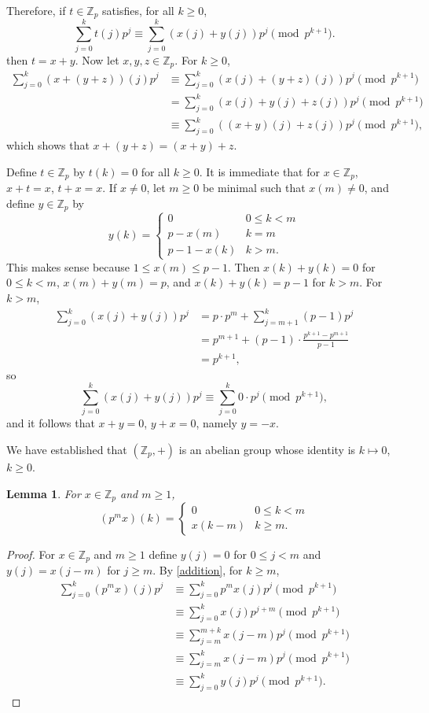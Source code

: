 \documentclass{article}
\newtheorem{lemma}[theorem]{Lemma}
\theoremstyle{definition}
\begin{document}
Therefore, if $t \in \mathbb{Z}_p$ satisfies, for all $k \geq 0$,
\[
\sum_{j=0}^k t(j) p^j \equiv \sum_{j=0}^k (x(j)+y(j)) p^j \pmod{p^{k+1}}.
\]
then $t=x+y$.
Now let $x,y,z \in \mathbb{Z}_p$. For $k \geq 0$,
\begin{align*}
\sum_{j=0}^k (x+(y+z))(j) p^j &\equiv \sum_{j=0}^k (x(j)+(y+z)(j)) p^j \pmod{p^{k+1}}\\
&=\sum_{j=0}^k (x(j)+y(j)+z(j)) p^j \pmod{p^{k+1}}\\
&\equiv \sum_{j=0}^k ((x+y)(j)+z(j)) p^j \pmod{p^{k+1}},
\end{align*}
which shows that $x+(y+z) = (x+y)+z$. 

Define $t \in \mathbb{Z}_p$ by $t(k)=0$ for all $k \geq 0$. It is immediate that for
$x \in \mathbb{Z}_p$, $x+t=x$, $t+x=x$. 
If $x \neq 0$, let $m \geq 0$ be minimal such that $x(m) \neq 0$, and define
$y \in \mathbb{Z}_p$ by
\[
y(k) =\begin{cases}
0&0 \leq k < m\\
p-x(m)&k=m\\
p-1-x(k)&k >m.
\end{cases}
\]
This makes sense because $1 \leq x(m) \leq p-1$. Then
$x(k)+y(k) =0$ for $0 \leq k < m$, $x(m)+y(m) = p$, and $x(k)+y(k)=p-1$ for $k>m$. For
$k > m$,
\begin{align*}
\sum_{j=0}^k (x(j)+y(j))p^j & = p\cdot p^m + \sum_{j=m+1}^k (p-1)p^j\\
&=p^{m+1} + (p-1) \cdot \frac{p^{k+1}-p^{m+1}}{p-1}\\
&=p^{k+1},
\end{align*}
so 
\[
\sum_{j=0}^k (x(j)+y(j))p^j \equiv \sum_{j=0}^k 0 \cdot p^j \pmod{p^{k+1}},
\]
and it follows that $x+y=0$, $y+x=0$, namely $y=-x$.

We have established that $(\mathbb{Z}_p,+)$ is an abelian group whose identity is 
 $k \mapsto 0$, $k \geq 0$.
 
\begin{lemma}
For $x \in \mathbb{Z}_p$ and $m \geq 1$, 
\[
(p^m x)(k) = \begin{cases}
0&0 \leq k < m\\
x(k-m)&k \geq m.
\end{cases}
\]
\label{timesp}
\end{lemma}
\begin{proof}
For $x \in \mathbb{Z}_p$ and $m \geq 1$ define 
$y(j)=0$ for $0 \leq j <m$ and 
$y(j) = x(j-m)$ for $j \geq m$.
By \eqref{addition}, for $k \geq m$,
\begin{align*}
\sum_{j=0}^k (p^mx)(j) p^j&\equiv \sum_{j=0}^k p^m x(j) p^j \pmod{p^{k+1}}\\
&\equiv \sum_{j=0}^k x(j)p^{j+m} \pmod{p^{k+1}}\\
&\equiv \sum_{j=m}^{m+k} x(j-m) p^j \pmod{p^{k+1}}\\
&\equiv \sum_{j=m}^k x(j-m) p^j \pmod{p^{k+1}}\\
&\equiv \sum_{j=0}^k y(j) p^j \pmod{p^{k+1}}.
\end{align*}
\end{proof}
\end{document}
